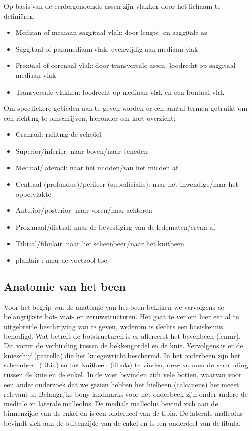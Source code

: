 Op basis van de eerdergenoemde assen zijn vlakken door het lichaam te defini\"{e}ren:
\begin{itemize}
	\item Mediaan of mediaan-saggitaal vlak: door lengte- en saggitale as
	\item Saggitaal of paramediaan vlak: evenwijdig aan mediaan vlak
	\item Frontaal of coronaal vlak: door transversale assen, loodrecht op saggitaal-mediaan vlak
	\item Transversale vlakken: loodrecht op mediaan vlak en een frontaal vlak
\end{itemize}

Om specifiekere gebieden aan te geven worden er een aantal termen gebruikt om een richting te omschrijven, hieronder een kort overzicht:
\begin{itemize}
	\item Craniaal: richting de schedel
	\item Superior/inferior: naar boven/naar beneden
	\item Mediaal/lateraal: naar het midden/van het midden af
	\item Centraal (profundus)/perifeer (superficialis): naar het inwendige/naar het oppervlakte
	\item Anterior/posterior: naar voren/naar achteren
	\item Proximaal/distaal: naar de bevestiging van de ledematen/ervan af
	\item Tibiaal/fibulair: naar het scheenbeen/naar het kuitbeen
	\item plantair : naar de voetzool toe
\end{itemize}

\subsection{Anatomie van het been}

Voor het begrip van de anatomie van het been bekijken we vervolgens de belangrijkste bot- vaat- en zenuwstructuren. Het gaat te ver om hier een al te uitgebreide beschrijving van te geven, wederom is slechts een basiskennis benodigd. Wat betreft de botstructuren is er allereerst het bovenbeen (femur). Dit vormt de verbinding tussen de bekkengordel en de knie. Vervolgens is er de knieschijf (pattella) die het kniegewricht beschermd. In het onderbeen zijn het scheenbeen (tibia) en het kuitbeen (fibula) te vinden, deze vormen de verbinding tussen de knie en de enkel. In de voet bevinden zich vele botten, waarvan voor een ander onderzoek dat we gezien hebben het hielbeen (calcaneus) het meest relevant is. Belangrijke bony landmarks voor het onderbeen zijn onder andere de mediale en laterale malleolus. De mediale malleolus bevind zich aan de binnenzijde van de enkel en is een onderdeel van de tibia. De laterale malleolus bevindt zich aan de buitenzijde van de enkel en is een onderdeel van de fibula.

